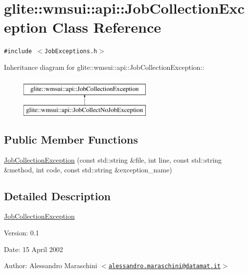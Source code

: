 \hypertarget{classglite_1_1wmsui_1_1api_1_1JobCollectionException}{
\section{glite::wmsui::api::Job\-Collection\-Exception Class Reference}
\label{classglite_1_1wmsui_1_1api_1_1JobCollectionException}
}
{\tt \#include $<$Job\-Exceptions.h$>$}

Inheritance diagram for glite::wmsui::api::Job\-Collection\-Exception::\begin{figure}[H]
\begin{center}
\leavevmode
\includegraphics[height=2cm]{classglite_1_1wmsui_1_1api_1_1JobCollectionException}
\end{center}
\end{figure}
\subsection*{Public Member Functions}
\begin{CompactItemize}
\item 
\hyperlink{classglite_1_1wmsui_1_1api_1_1JobCollectionException_a0}{Job\-Collection\-Exception} (const std::string \&file, int line, const std::string \&method, int code, const std::string \&exception\_\-name)
\end{CompactItemize}


\subsection{Detailed Description}
\hyperlink{classglite_1_1wmsui_1_1api_1_1JobCollectionException}{Job\-Collection\-Exception} \begin{Desc}
\item[Version:]0.1 \end{Desc}
\begin{Desc}
\item[Date:]15 April 2002 \end{Desc}
\begin{Desc}
\item[Author:]Alessandro Maraschini $<$\href{mailto:alessandro.maraschini@datamat.it}{\tt alessandro.maraschini@datamat.it}$>$ \end{Desc}




